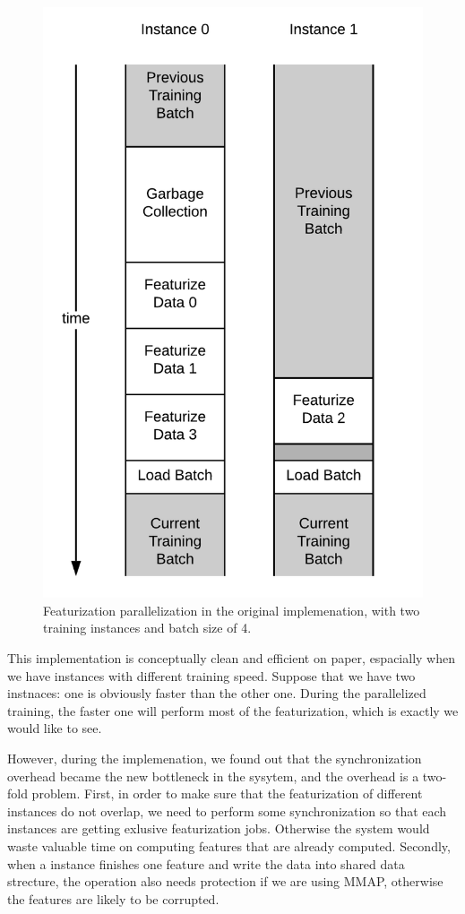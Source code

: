 \documentclass[conference]{IEEEtran}
\begin{document}
\begin{figure}[!htb]
	\includegraphics[width=\linewidth]{oi.png}
	\caption{\small 
		Featurization parallelization in the original implemenation, with two training instances and batch size of 4. }
	\label{fig:oi}
\end{figure}

This implementation is conceptually clean and efficient on paper, espacially when we have instances with different training speed. 
Suppose that we have two instnaces: one is obviously faster than the other one. 
During the parallelized training, the faster one will perform most of the featurization, which is exactly we would like to see. 

However, during the implemenation, we found out that the synchronization overhead became the new bottleneck in the sysytem, and the overhead is a two-fold problem. 
First, in order to make sure that the featurization of different instances do not overlap, we need to perform some synchronization so that each instances are getting exlusive featurization jobs. 
Otherwise the system would waste valuable time on computing features that are already computed. 
Secondly, when a instance finishes one feature and write the data into shared data strecture, the operation also needs protection if we are using MMAP, otherwise the features are likely to be corrupted. 
\end{document}
